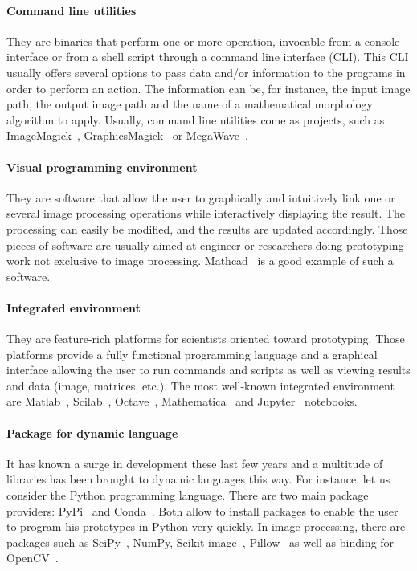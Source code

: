\paragraph{Command line utilities} They are binaries that perform one or more operation, invocable from a console
interface or from a shell script through a command line interface (CLI). This CLI usually offers several options to pass
data and/or information to the programs in order to perform an action. The information can be, for instance, the input
image path, the output image path and the name of a mathematical
morphology~\parencite{najman.2013.mathematical,geraud.2010.book} algorithm to apply. Usually, command line utilities
come as projects, such as ImageMagick~\parencite{imagemagick.2021}, GraphicsMagick~\parencite{graphicsmagick.2021} or
MegaWave~\parencite{froment.2012.megawave,froment.2004.megawave2}.

\paragraph{Visual programming environment} They are software that allow the user to graphically and intuitively link one
or several image processing operations while interactively displaying the result. The processing can easily be modified,
and the results are updated accordingly. Those pieces of software are usually aimed at engineer or researchers doing
prototyping work not exclusive to image processing. Mathcad~\parencite{ptc.2019.mathcad} is a good example of such a
software.

\paragraph{Integrated environment} They are feature-rich platforms for scientists oriented toward prototyping. Those
platforms provide a fully functional programming language and a graphical interface allowing the user to run commands
and scripts as well as viewing results and data (image, matrices, etc.). The most well-known integrated environment
are Matlab~\parencite{mathworks.2020.matlab}, Scilab~\parencite{scilab.2020}, Octave~\parencite{gnu.2021.octave},
Mathematica~\parencite{wolfram.2020.mathematica} and Jupyter~\parencite{kluyver.2016.jupyter} notebooks.

\paragraph{Package for dynamic language} It has known a surge in development these last few years and a multitude of
libraries has been brought to dynamic languages this way. For instance, let us consider the Python programming language.
There are two main package providers: PyPi~\parencite{pypi.2021} and Conda~\parencite{anaconda.2020}. Both allow to
install packages to enable the user to program his prototypes in Python very quickly. In image processing, there are
packages such as SciPy~\parencite{jones.2006.scipy}, NumPy, Scikit-image~\parencite{vanderwalt.2014.skimage},
Pillow~\parencite{clark.2021.pillow} as well as binding for OpenCV~\parencite{bradski.2000.opencv}.

